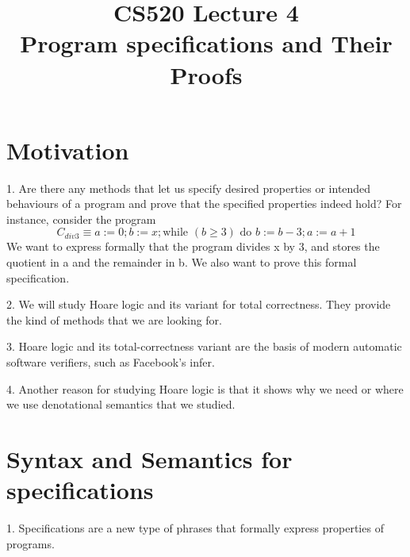 \documentclass{report}[12pt]
\begin{document}
\setlength\parindent{0pt}

  {\topsep}{\topsep}%
  {\itshape}{}%
  {\bfseries}{}%
  {\newline}{}%

\theoremstyle{break}

\newtheorem{theorem}{Theorem}[section]
\newtheorem{definition}{Definition}
\newtheorem{proposition}{Proposition}
\newtheorem{corollary}{Corollary}
\newtheorem{lemma}{Lemma}
\newtheorem{example}{Example}
\newcommand{\nonterminal}[1]{\langle \text{#1}\rangle}
\newcommand{\rem}[0]{\text{ rem }}
\newcommand{\interp}[1]{\llbracket #1 \rrbracket}
\newcommand{\bbot}[0]{\Perp}
\newcommand{\TODO}[1]{TODO : #1}

\setcounter{chapter}{4}

\title{CS520 Lecture 4\\Program specifications and Their Proofs}
\maketitle

\section{Motivation}
1. Are there any methods that let us specify desired properties or intended behaviours of a program and prove that the specified properties indeed hold? For instance, consider the program
\[C_{div3} \equiv a:=0; b:=x; \text{while }(b \ge 3) \text{ do }b:=b-3;a:=a+1\]
We want to express formally that the program divides x by 3, and stores the quotient in a and the remainder in b. We also want to prove this formal specification.

2. We will study Hoare logic and its variant for total correctness. They provide the kind of methods that we are looking for.

3. Hoare logic and its total-correctness variant are the basis of modern automatic software verifiers, such as Facebook's infer.

4. Another reason for studying Hoare logic is that it shows why we need or where we use denotational semantics that we studied.

\section{Syntax and Semantics for specifications}
1. Specifications are a new type of phrases that formally express properties of programs.
\end{document}
